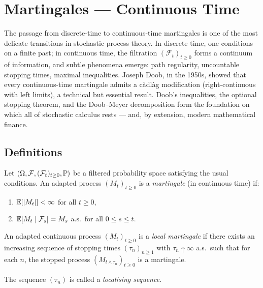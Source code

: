 \chapter{Martingales --- Continuous Time}
\label{ch:continuous_martingales}

The passage from discrete-time to continuous-time martingales is one of the most delicate transitions in stochastic process theory. In discrete time, one conditions on a finite past; in continuous time, the filtration $(\mathcal{F}_t)_{t \geq 0}$ forms a continuum of information, and subtle phenomena emerge: path regularity, uncountable stopping times, maximal inequalities. Joseph Doob, in the 1950s, showed that every continuous-time martingale admits a c\`adl\`ag modification (right-continuous with left limits), a technical but essential result. Doob's inequalities, the optional stopping theorem, and the Doob--Meyer decomposition form the foundation on which all of stochastic calculus rests --- and, by extension, modern mathematical finance.

\section{Definitions}

\begin{definition}
Let $(\Omega, \mathcal{F}, (\mathcal{F}_t)_{t \geq 0}, \mathbb{P})$ be a filtered
probability space satisfying the usual conditions. An adapted process
$(M_t)_{t \geq 0}$ is a \emph{martingale} (in continuous time) if:
\begin{enumerate}
  \item $\mathbb{E}[\left| M_t \right|] < \infty$ for all $t \geq 0$,
  \item $\mathbb{E}[M_t \mid \mathcal{F}_s] = M_s$ a.s.\ for all $0 \leq s \leq t$.
\end{enumerate}
\end{definition}

\begin{definition}
An adapted continuous process $(M_t)_{t \geq 0}$ is a \emph{local martingale}
if there exists an increasing sequence of stopping times $(\tau_n)_{n \geq 1}$
with $\tau_n \uparrow \infty$ a.s.\ such that for each $n$, the stopped process
$(M_{t \wedge \tau_n})_{t \geq 0}$ is a martingale.

The sequence $(\tau_n)$ is called a \emph{localising sequence}.
\end{definition}

